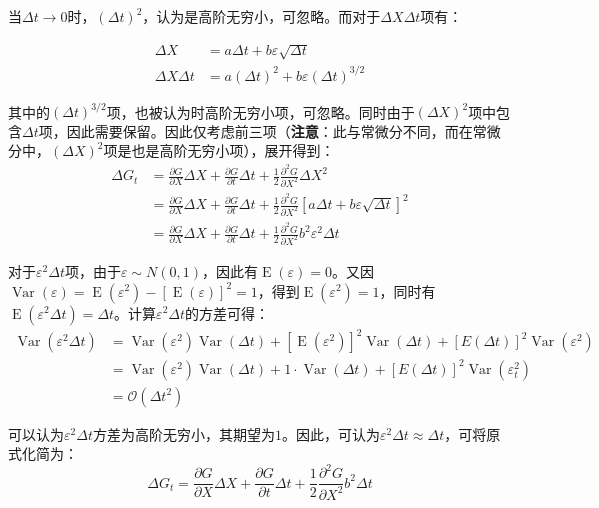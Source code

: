 \documentclass[11pt]{article}
\newcommand{\E}{\operatorname{E}}
\newcommand{\Var}{\operatorname{Var}}
\begin{document}
当$\Delta t \rightarrow 0$时，$(\Delta t)^2$，认为是高阶无穷小，可忽略。而对于$\Delta X \Delta t$项有：

\begin{align*}
    \Delta X &= a\Delta t + b \varepsilon\sqrt{\Delta t} \\
    \Delta X \Delta t &= a(\Delta t)^2 + b \varepsilon(\Delta t)^{3/2}
\end{align*}

其中的$(\Delta t)^{3/2}$项，也被认为时高阶无穷小项，可忽略。同时由于$(\Delta X)^2$项中包含$\Delta t$项，因此需要保留。因此仅考虑前三项（\textbf{注意}：此与常微分不同，而在常微分中，$(\Delta X)^2$项是也是高阶无穷小项），展开得到：
\begin{align*}
    \Delta G_t & = \frac{\partial G}{\partial X} \Delta X + \frac{\partial G}{\partial t} \Delta t + \frac{1}{2} \frac{\partial^2 G}{\partial X^2}\Delta X^2 \\
    & = \frac{\partial G}{\partial X} \Delta X + \frac{\partial G}{\partial t} \Delta t + \frac{1}{2} \frac{\partial^2 G}{\partial X^2} [a\Delta t + b\varepsilon\sqrt{\Delta t}]^2 \\
    & = \frac{\partial G}{\partial X} \Delta X + \frac{\partial G}{\partial t} \Delta t + \frac{1}{2} \frac{\partial^2 G}{\partial X^2} b^2 \varepsilon^2 \Delta t
\end{align*}

对于$\varepsilon^2 \Delta t$项，由于$\varepsilon \sim N(0,1)$，因此有$\E(\varepsilon)=0$。又因$\Var(\varepsilon)=\E(\varepsilon^2)-[\E(\varepsilon)]^2=1$，得到$\E(\varepsilon^2)=1$，同时有$\E(\varepsilon^2 \Delta t) = \Delta t$。计算$\varepsilon^2 \Delta t$的方差可得：
\begin{align*}
    \Var(\varepsilon^2 \Delta t) & = \Var(\varepsilon^2) \Var(\Delta t) + [\E(\varepsilon^2)]^2 \Var(\Delta t) + [E(\Delta t)]^2 \Var(\varepsilon^2) \\
    & = \Var(\varepsilon^2) \Var(\Delta t) + 1 \cdot \Var(\Delta t) + [E(\Delta t)]^2 \Var(\varepsilon_t^2) \\
    & = \mathcal{O}(\Delta t^2)
\end{align*}

可以认为$\varepsilon^2 \Delta t$方差为高阶无穷小，其期望为$1$。因此，可认为$\varepsilon^2 \Delta t \approx \Delta t$，可将原式化简为：
\begin{equation*}
    \Delta G_t = \frac{\partial G}{\partial X} \Delta X + \frac{\partial G}{\partial t} \Delta t + \frac{1}{2} \frac{\partial^2 G}{\partial X^2} b^2 \Delta t
\end{equation*}
\end{document}
